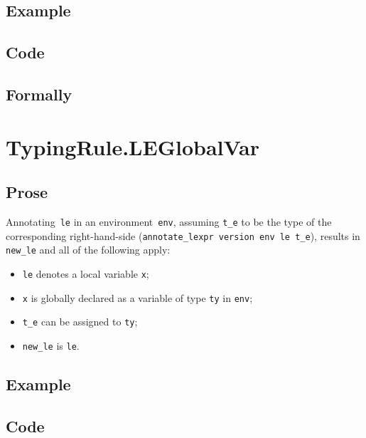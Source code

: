 \documentclass{book}
\begin{document}
  \subsection{Example}

  \subsection{Code}

\begin{emptyformal}
    \subsection{Formally}
\end{emptyformal}


\section{TypingRule.LEGlobalVar \label{sec:TypingRule.LEGlobalVar}}

  \subsection{Prose}
   Annotating~\texttt{le} in an environment~\texttt{env}, assuming
\texttt{t\_e} to be the type of the corresponding right-hand-side
(\texttt{annotate\_lexpr version env le t\_e}), results in \texttt{new\_le} and
all of the following apply:
   \begin{itemize}
   \item \texttt{le} denotes a local variable \texttt{x};
   \item \texttt{x} is globally declared as a variable of type \texttt{ty} in \texttt{env};
   \item \texttt{t\_e} can be assigned to \texttt{ty};
   \item \texttt{new\_le} is \texttt{le}.
   \end{itemize}
 
  \subsection{Example}

  \subsection{Code}
\end{document}
